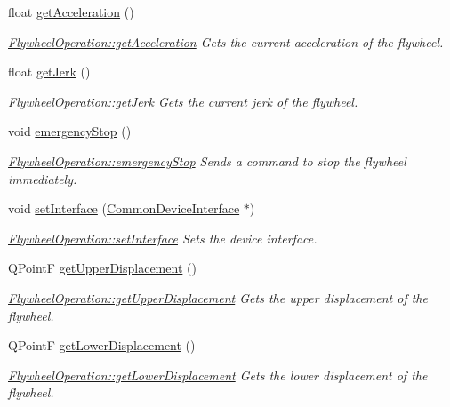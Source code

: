 \begin{DoxyCompactItemize}
float \hyperlink{class_flywheel_operation_a23310ab41f29ee3d510c2d412fde801b}{get\+Acceleration} ()
\begin{DoxyCompactList}\small\item\em \hyperlink{class_flywheel_operation_a23310ab41f29ee3d510c2d412fde801b}{Flywheel\+Operation\+::get\+Acceleration} Gets the current acceleration of the flywheel. \end{DoxyCompactList}\item 
float \hyperlink{class_flywheel_operation_ad443ef22229c1584da213f50234720bf}{get\+Jerk} ()
\begin{DoxyCompactList}\small\item\em \hyperlink{class_flywheel_operation_ad443ef22229c1584da213f50234720bf}{Flywheel\+Operation\+::get\+Jerk} Gets the current jerk of the flywheel. \end{DoxyCompactList}\item 
void \hyperlink{class_flywheel_operation_a6a393e52299f7a48950f019d0f3db7de}{emergency\+Stop} ()
\begin{DoxyCompactList}\small\item\em \hyperlink{class_flywheel_operation_a6a393e52299f7a48950f019d0f3db7de}{Flywheel\+Operation\+::emergency\+Stop} Sends a command to stop the flywheel immediately. \end{DoxyCompactList}\item 
void \hyperlink{class_flywheel_operation_ab655d2757d24dbb605a8eb0c16bc0fe8}{set\+Interface} (\hyperlink{class_common_device_interface}{Common\+Device\+Interface} $\ast$)
\begin{DoxyCompactList}\small\item\em \hyperlink{class_flywheel_operation_ab655d2757d24dbb605a8eb0c16bc0fe8}{Flywheel\+Operation\+::set\+Interface} Sets the device interface. \end{DoxyCompactList}\item 
Q\+PointF \hyperlink{class_flywheel_operation_a16ebc2fe8c3297350eaf9be2114a75c8}{get\+Upper\+Displacement} ()
\begin{DoxyCompactList}\small\item\em \hyperlink{class_flywheel_operation_a16ebc2fe8c3297350eaf9be2114a75c8}{Flywheel\+Operation\+::get\+Upper\+Displacement} Gets the upper displacement of the flywheel. \end{DoxyCompactList}\item 
Q\+PointF \hyperlink{class_flywheel_operation_a2b9d24d0fbbf1d9cb79bb0aa54f6f6ae}{get\+Lower\+Displacement} ()
\begin{DoxyCompactList}\small\item\em \hyperlink{class_flywheel_operation_a2b9d24d0fbbf1d9cb79bb0aa54f6f6ae}{Flywheel\+Operation\+::get\+Lower\+Displacement} Gets the lower displacement of the flywheel. \end{DoxyCompactList}\item 

\end{DoxyCompactItemize}
